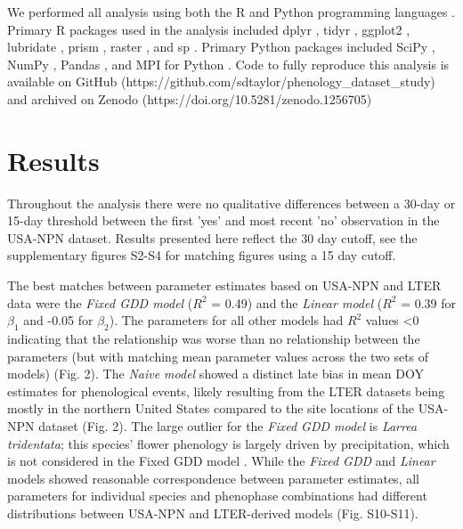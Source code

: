 \documentclass[fleqn,12pt,lineno]{article}
\begin{document}
We performed all analysis using both the R and Python programming languages \citep{rcitation, python}. Primary R packages used in the analysis included dplyr \citep{dplyr}, tidyr \citep{tidyr}, ggplot2 \citep{ggplot2}, lubridate \citep{lubridate}, prism \citep{prismR}, raster \citep{rasterR}, and sp \citep{sp1}. Primary Python packages included SciPy \citep{scipy}, NumPy \citep{numpy}, Pandas \citep{pandas}, and MPI for Python \citep{mpi4py}. Code to fully reproduce this analysis is available on GitHub  (https://github.com/sdtaylor/phenology\_dataset\_study) and archived on Zenodo  (https://doi.org/10.5281/zenodo.1256705)

\section*{Results}

Throughout the analysis there were no qualitative differences between a 30-day or 15-day threshold between the first 'yes' and most recent 'no' observation in the USA-NPN dataset. Results presented here reflect the 30 day cutoff, see the supplementary figures S2-S4 for matching figures using a 15 day cutoff. 

The best matches between parameter estimates based on USA-NPN and LTER data were the \textit{Fixed GDD model} ($R^2$ = 0.49) and the \textit{Linear model} ($R^2$ = 0.39 for $\beta_{1}$ and -0.05 for $\beta_{2}$). The parameters for all other models had $R^2$ values \textless 0 indicating that the relationship was worse than no relationship between the parameters (but with matching mean parameter values across the two sets of models) (Fig. 2). The \textit{Naive model} showed a distinct late bias in mean DOY estimates for phenological events, likely resulting from the LTER datasets being mostly in the northern United States compared to the site locations of the USA-NPN dataset (Fig. 2). The large outlier for the \textit{Fixed GDD model} is \textit{Larrea tridentata}; this species' flower phenology is largely driven by precipitation, which is not considered in the Fixed GDD model \citep{beatley1974}. While the \textit{Fixed GDD} and \textit{Linear} models showed reasonable correspondence between parameter estimates, all parameters for individual species and phenophase combinations had different distributions between USA-NPN and LTER-derived models (Fig. S10-S11).
\end{document}
